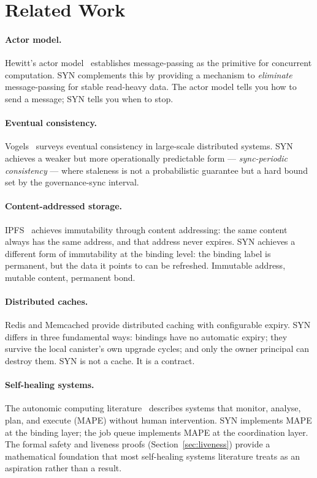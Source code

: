 \documentclass[12pt]{article}
\begin{document}
\section{Related Work}
\label{sec:related}

\paragraph{Actor model.}
Hewitt's actor model~\cite{hewitt1973} establishes message-passing as the
primitive for concurrent computation.  SYN complements this by providing a
mechanism to \emph{eliminate} message-passing for stable read-heavy data.
The actor model tells you how to send a message; SYN tells you when to stop.

\paragraph{Eventual consistency.}
Vogels~\cite{vogels2009} surveys eventual consistency in large-scale distributed
systems.  SYN achieves a weaker but more operationally predictable form —
\emph{sync-periodic consistency} — where staleness is not a probabilistic
guarantee but a hard bound set by the governance-sync interval.

\paragraph{Content-addressed storage.}
IPFS~\cite{benet2014} achieves immutability through content addressing: the
same content always has the same address, and that address never expires.  SYN
achieves a different form of immutability at the binding level: the binding
label is permanent, but the data it points to can be refreshed.  Immutable
address, mutable content, permanent bond.

\paragraph{Distributed caches.}
Redis and Memcached provide distributed caching with configurable expiry.  SYN
differs in three fundamental ways: bindings have no automatic expiry; they
survive the local canister's own upgrade cycles; and only the owner principal
can destroy them.  SYN is not a cache.  It is a contract.

\paragraph{Self-healing systems.}
The autonomic computing literature~\cite{kephart2003, salehie2009} describes
systems that monitor, analyse, plan, and execute (MAPE) without human
intervention.  SYN implements MAPE at the binding layer; the job queue
implements MAPE at the coordination layer.  The formal safety and liveness
proofs (Section~\ref{sec:liveness}) provide a mathematical foundation that
most self-healing systems literature treats as an aspiration rather than a result.
\end{document}
